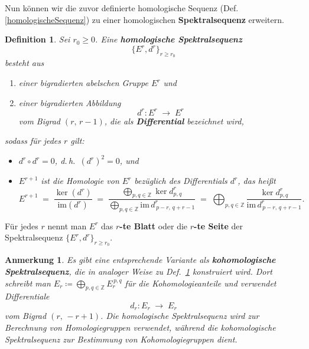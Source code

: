 \documentclass[12pt]{article}
\numberwithin{conj}{section}
\newtheorem{definition}[conj]{Definition}
\newtheorem{remark}[conj]{Anmerkung}
\newcommand{\Z}{\mathbb{Z}}
\begin{document}
    Nun können wir die zuvor definierte homologische Sequenz (Def. \ref{homologischeSequenz})
    zu einer homologischen \textbf{Spektralsequenz} erweitern.

    \begin{definition}
        \label{homologischeSpektraleSequenz} Sei $r_{0} \geq 0$. Eine \textbf{homologische
        Spektralsequenz}
        \[
            \{E^{r},d^{r}\}_{r \geq r_0}
        \]
        besteht aus
        \begin{enumerate}[nolistsep]
            \item einer bigradierten abelschen Gruppe $E^{r}$ und

            \item einer bigradierten Abbildung
                \[
                    d^{r} : E^{r} \;\longrightarrow\; E^{r}
                \]
                vom Bigrad $(r,\,r-1)$, die als \textbf{Differential} bezeichnet wird,
        \end{enumerate}
        sodass für jedes $r$ gilt:
        \begin{itemize}[nolistsep]
            \item $d^{r} \circ d^{r} = 0$, d.\,h.\ $(d^{r})^{2} = 0$, und

            \item $E^{r+1}$ ist die Homologie von $E^{r}$ bezüglich des Differentials $d
                ^{r}$, das heißt
                \[
                    E^{r+1}\;=\; \frac{\ker(d^{r})}{\mathrm{im}(d^{r})}\;=\; \frac{\displaystyle\bigoplus_{p,q
                    \in \Z}\ker d^{r}_{p,q} }%
                    {\displaystyle\bigoplus_{p,q \in \Z} \mathrm{im}\, d^r_{\,p-r,\,q+r-1} }
                    \;=\; \bigoplus_{p,q \in \Z}\frac{\ker d^{r}_{p,q} }{\mathrm{im}\, d^{r}_{\,p-r,\,q+r-1} }
                    .
                \]
        \end{itemize}
    \end{definition}

    Für jedes $r$ nennt man $E^{r}$ das \textbf{$r$-te Blatt} oder die \textbf{$r$-te
    Seite} der Spektralsequenz $\{E^{r},d^{r}\}_{r \geq r_0}$.

    \begin{remark}
        Es gibt eine entsprechende Variante als \textbf{kohomologische
        Spektralsequenz}, die in analoger Weise zu Def.~\ref{homologischeSpektraleSequenz}
        konstruiert wird. Dort schreibt man
        $E_{r} \coloneqq \bigoplus_{p,q \in \Z}E_{r}^{\,p,q}$ für die
        Kohomologieanteile und verwendet Differentiale
        \[
            d_{r} : E_{r} \;\longrightarrow\; E_{r}
        \]
        vom Bigrad $(r,\,-r+1)$. Die homologische Spektralsequenz wird zur Berechnung
        von Homologiegruppen verwendet, während die kohomologische Spektralsequenz
        zur Bestimmung von Kohomologiegruppen dient.
    \end{remark}
\end{document}
